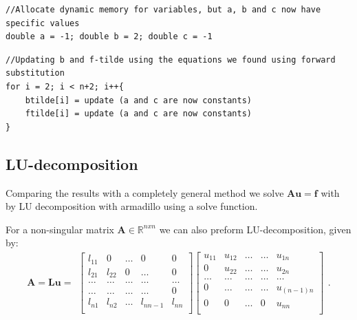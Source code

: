 \documentclass{emulateapj}
\newcommand{\R}{\mathbb{R}}
\begin{document}
%
\begin{lstlisting}
//Allocate dynamic memory for variables, but a, b and c now have specific values
double a = -1; double b = 2; double c = -1
\end{lstlisting}

\begin{lstlisting}
//Updating b and f-tilde using the equations we found using forward substitution
for i = 2; i < n+2; i++{
    btilde[i] = update (a and c are now constants)
    ftilde[i] = update (a and c are now constants)
}

\end{lstlisting}
%

\subsection{LU-decomposition}
Comparing the results with a completely general method we solve $\boldsymbol{A}\boldsymbol{u} = \boldsymbol{f}$ with by LU decomposition with armadillo using a solve function. 

For a non-singular matrix $\boldsymbol{A} \in \R ^{nxn}$ we can also preform LU-decomposition, given by:
%
\[ \boldsymbol{A} = \boldsymbol{Lu} =
\begin{array}{c}
\begin{bmatrix}\label{eq:A = Lu}
l_{11}     & 0           & \dots         & 0       & 0 \\
l_{21}     & l_{22}           & 0       & \dots      & 0       \\
\dots       & \dots           & \dots       & \dots      & \dots    \\
\dots       & \dots           & \dots       & \dots      & 0    \\
 l_{n1} &  l_{n2}            & \dots        & l_{nn-1}      & l_{nn}     \\
\end{bmatrix}
\begin{bmatrix}
u_{11}     & u_{12}            & \dots         & \dots       & u_{1n} \\
0     & u_{22}           & \dots       & \dots      & u_{2n}       \\
\dots       & \dots           & \dots       & \dots      & \dots    \\
0       & \dots           & \dots       & \dots      & u_{(n-1)n}    \\
 0 &  0            & \dots        & 0      & u_{nn}     \\
\end{bmatrix}

\end{array}.
\]
%
\end{document}
